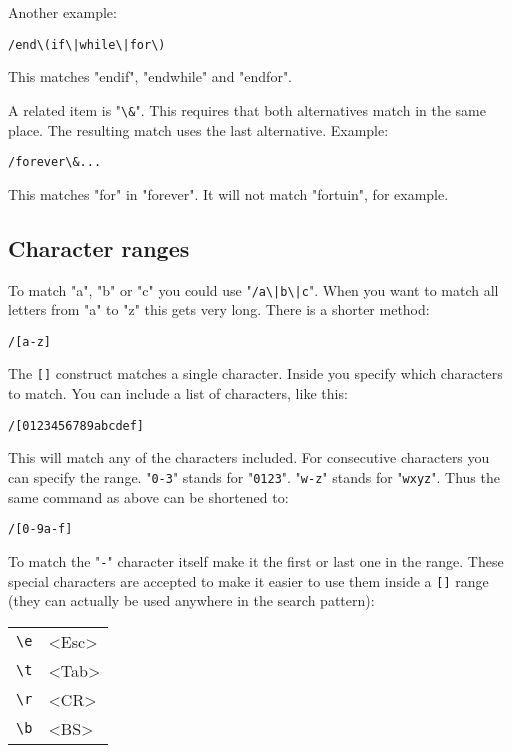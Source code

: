 Another example:

\begin{Verbatim}[samepage=true]
 /end\(if\|while\|for\)
\end{Verbatim}

This matches "endif", "endwhile" and "endfor".

A related item is "\verb!\&!".
This requires that both alternatives match in the same place.
The resulting match uses the last alternative.
Example:

\begin{Verbatim}[samepage=true]
 /forever\&...
\end{Verbatim}

This matches "for" in "forever".  It will not match "fortuin", for example.
\subsection{Character ranges}
To match "a", "b" or "c" you could use "\verb!/a\|b\|c!".
When you want to match all letters from "a" to "z" this gets very long.
There is a shorter method:

\begin{Verbatim}[samepage=true]
 /[a-z]
\end{Verbatim}

The \verb![]! construct matches a single character.
Inside you specify which characters to match.
You can include a list of characters, like this:

\begin{Verbatim}[samepage=true]
 /[0123456789abcdef]
\end{Verbatim}

This will match any of the characters included.
For consecutive characters you can specify the range.
"\verb!0-3!" stands for "\verb!0123!".
"\verb!w-z!" stands for "\verb!wxyz!".
Thus the same command as above can be shortened to:

\begin{Verbatim}[samepage=true]
 /[0-9a-f]
\end{Verbatim}

To match the "\verb!-!" character itself make it the first or last one in the range.
These special characters are accepted to make it easier to use them inside a \verb![]! range (they can actually be used anywhere in the search pattern):

\begin{center} \begin{tabular}{l l}
				\verb!\e! & <Esc> \\
				\verb!\t! & <Tab> \\
				\verb!\r! & <CR>  \\
				\verb!\b! & <BS>  \\
\end{tabular} \end{center}

